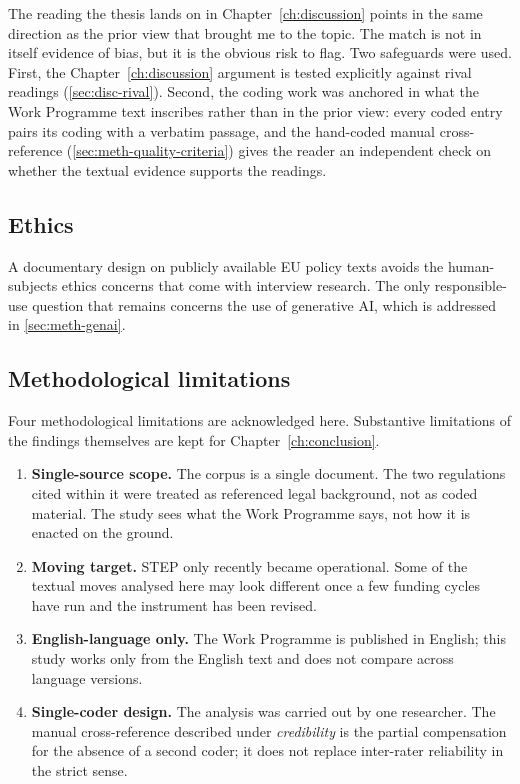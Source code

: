 The reading the thesis lands on in Chapter~\ref{ch:discussion}
points in the same direction as the prior view that brought me to
the topic. The match is not in itself evidence of bias, but it is
the obvious risk to flag. Two safeguards were used. First, the
Chapter~\ref{ch:discussion} argument is tested explicitly against
rival readings (\cref{sec:disc-rival}). Second, the coding work was
anchored in what the Work Programme text inscribes rather than in the
prior view: every coded entry pairs its coding with a verbatim
passage, and the hand-coded manual cross-reference
(\cref{sec:meth-quality-criteria}) gives the reader an independent
check on whether the textual evidence supports the readings.


\subsection{Ethics}
\label{sec:meth-ethics}

A documentary design on publicly available EU policy texts avoids the
human-subjects ethics concerns that come with interview research. The
only responsible-use question that remains concerns the use of
generative AI, which is addressed in \cref{sec:meth-genai}.

\subsection{Methodological limitations}
\label{sec:meth-limits}

Four methodological limitations are acknowledged here. Substantive
limitations of the findings themselves are kept for
Chapter~\ref{ch:conclusion}.

\begin{enumerate}[leftmargin=*]
  \item \textbf{Single-source scope.} The corpus is a single document.
        The two regulations cited within it were treated as referenced
        legal background, not as coded material. The study sees what
        the Work Programme says, not how it is enacted on the ground.
  \item \textbf{Moving target.} STEP only recently became operational.
        Some of the textual moves analysed here may look different
        once a few funding cycles have run and the instrument has been
        revised.
  \item \textbf{English-language only.} The Work Programme is published
        in English; this study works only from the English text and
        does not compare across language versions.
  \item \textbf{Single-coder design.} The analysis was carried out by
        one researcher. The manual cross-reference described under
        \emph{credibility} is the partial compensation for the absence
        of a second coder; it does not replace inter-rater reliability
        in the strict sense.
\end{enumerate}

